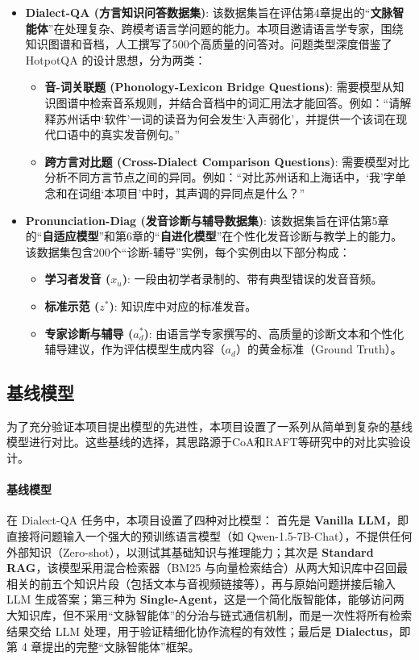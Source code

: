 \begin{itemize}
    \item \textbf{Dialect-QA (方言知识问答数据集)}: 该数据集旨在评估第4章提出的“\textbf{文脉智能体}”在处理复杂、跨模考语言学问题的能力。本项目邀请语言学专家，围绕知识图谱和音档，人工撰写了500个高质量的问答对。问题类型深度借鉴了HotpotQA 的设计思想，分为两类：
    \begin{itemize}
        \item \textbf{音-词关联题 (Phonology-Lexicon Bridge Questions)}: 需要模型从知识图谱中检索音系规则，并结合音档中的词汇用法才能回答。例如：“请解释苏州话中‘软件’一词的读音为何会发生‘入声弱化’，并提供一个该词在现代口语中的真实发音例句。”
        \item \textbf{跨方言对比题 (Cross-Dialect Comparison Questions)}: 需要模型对比分析不同方言节点之间的异同。例如：“对比苏州话和上海话中，‘我’字单念和在词组‘本项目’中时，其声调的异同点是什么？”
    \end{itemize}

    \item \textbf{Pronunciation-Diag (发音诊断与辅导数据集)}: 该数据集旨在评估第5章的“\textbf{自适应模型}”和第6章的“\textbf{自进化模型}”在个性化发音诊断与教学上的能力。该数据集包含200个“诊断-辅导”实例，每个实例由以下部分构成：
    \begin{itemize}
        \item \textbf{学习者发音 ($x_u$)}: 一段由初学者录制的、带有典型错误的发音音频。
        \item \textbf{标准示范 ($z^*$)}: 知识库中对应的标准发音。
        \item \textbf{专家诊断与辅导 ($a_d^*$)}: 由语言学专家撰写的、高质量的诊断文本和个性化辅导建议，作为评估模型生成内容（$a_d$）的黄金标准（Ground Truth）。
    \end{itemize}
\end{itemize}

\subsection{基线模型}
为了充分验证本项目提出模型的先进性，本项目设置了一系列从简单到复杂的基线模型进行对比。这些基线的选择，其思路源于CoA和RAFT等研究中的对比实验设计。

\paragraph{基线模型}

在 Dialect-QA 任务中，本项目设置了四种对比模型：  
首先是 \textbf{Vanilla LLM}，即直接将问题输入一个强大的预训练语言模型（如 Qwen-1.5-7B-Chat），不提供任何外部知识（Zero-shot），以测试其基础知识与推理能力；其次是 \textbf{Standard RAG}，该模型采用混合检索器（BM25 与向量检索结合）从两大知识库中召回最相关的前五个知识片段（包括文本与音视频链接等），再与原始问题拼接后输入 LLM 生成答案；第三种为 \textbf{Single-Agent}，这是一个简化版智能体，能够访问两大知识库，但不采用“文脉智能体”的分治与链式通信机制，而是一次性将所有检索结果交给 LLM 处理，用于验证精细化协作流程的有效性；最后是 \textbf{Dialectus}，即第 4 章提出的完整“文脉智能体”框架。

